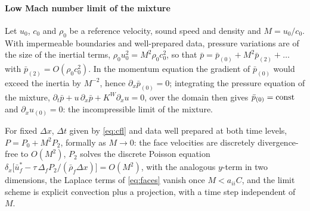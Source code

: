 \paragraph{Low Mach number limit of the mixture}
Let $u_0$, $c_0$ and $\rho_0$ be a reference velocity, sound speed and density and $M=u_0/c_0$. With impermeable
boundaries and well-prepared data, pressure variations are of the size of the inertial terms, $\rho_0u_0^2=M^2\rho_0c_0^2$,
so that $\bar p=\bar p_{(0)}+M^2\bar p_{(2)}+\dots$ with $\bar p_{(2)}=O(\rho_0c_0^2)$. In the momentum equation the gradient of
$\bar p_{(0)}$ would exceed the inertia by $M^{-2}$, hence $\partial_x\bar p_{(0)}=0$; integrating the pressure equation of the
mixture, $\partial_t\bar p+u\,\partial_x\bar p+K^W\partial_xu=0$, over the domain then gives $\bar p_{(0)}={\rm const}$ and
$\partial_xu_{(0)}=0$: the incompressible limit of the mixture.
\begin{proposition}\label{prop:lowmach}
For fixed $\Delta x$, $\Delta t$ given by \eqref{eq:cfl} and data well prepared at both time levels, $P=P_0+M^2P_2$, formally as
$M\to0$: the face velocities are discretely divergence-free to $O(M^2)$, $P_2$ solves the discrete Poisson equation
$\delta_x\big[\bar u^*_f-\tau\,\Delta_fP_2/(\bar\rho_f\Delta x)\big]=O(M^2)$, with the analogous $y$-term in two dimensions, the Laplace terms of
\eqref{eq:faces} vanish once $M<a_{ii}C$, and the limit scheme is explicit convection plus a projection, with a time step
independent of $M$.
\end{proposition}
